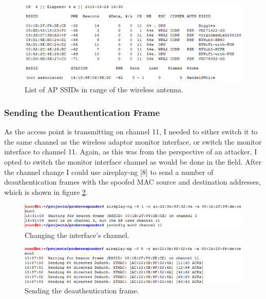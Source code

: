 \begin{figure}[h!]
\includegraphics[width=\linewidth]{research/attackvectors/figures/ddos-1.png}
\caption{List of AP SSIDs in range of the wireless antenna.}
\label{ddos-1}
\end{figure}

\subsubsection*{Sending the Deauthentication Frame}
As the access point is transmitting on channel 11, I needed to either switch it to the same channel as the wireless adaptor monitor interface, or switch the monitor interface to channel 11. Again, as this was from the perspective of an attacker, I opted to switch the monitor interface channel as would be done in the field. After the channel change I could use aireplay-ng [8] to send a number of deauthentication frames with the spoofed MAC source and destination addresses, which is shown in figure \ref{ddos-3}.

\begin{figure}[h!]
\includegraphics[width=\linewidth]{research/attackvectors/figures/ddos-2.png}
\caption{Changing the interface's channel.}
\end{figure}

\begin{figure}[h!]
\includegraphics[width=\linewidth]{research/attackvectors/figures/ddos-3.png}
\caption{Sending the deauthentication frame.}
\label{ddos-3}
\end{figure}

